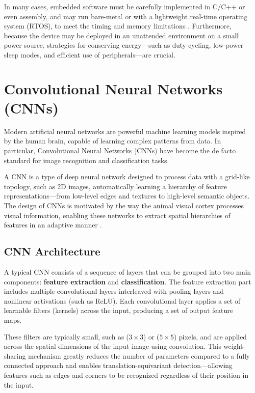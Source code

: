 In many cases, embedded software must be carefully implemented in C/C++ or even assembly, and may run bare-metal or with a lightweight real-time operating system (RTOS), to meet the timing and memory limitations \cite{techtarget_embedded_system}. Furthermore, because the device may be deployed in an unattended environment on a small power source, strategies for conserving energy---such as duty cycling, low-power sleep modes, and efficient use of peripherals---are crucial.


\clearpage

\section{Convolutional Neural Networks (CNNs)}

Modern artificial neural networks are powerful machine learning models inspired by the human brain, capable of learning complex patterns from data. In particular, Convolutional Neural Networks (CNNs) have become the de facto standard for image recognition and classification tasks.

A CNN is a type of deep neural network designed to process data with a grid-like topology, such as 2D images, automatically learning a hierarchy of feature representations---from low-level edges and textures to high-level semantic objects. The design of CNNs is motivated by the way the animal visual cortex processes visual information, enabling these networks to extract spatial hierarchies of features in an adaptive manner \cite{yamashita2018convolutional}.

\subsection{CNN Architecture}

A typical CNN consists of a sequence of layers that can be grouped into two main components: \textbf{feature extraction} and \textbf{classification}. The feature extraction part includes multiple convolutional layers interleaved with pooling layers and nonlinear activations (such as ReLU). Each convolutional layer applies a set of learnable filters (kernels) across the input, producing a set of output feature maps.

These filters are typically small, such as (\(3 \times 3\)) or (\(5 \times 5\)) pixels, and are applied across the spatial dimensions of the input image using convolution. This weight-sharing mechanism greatly reduces the number of parameters compared to a fully connected approach and enables translation-equivariant detection---allowing features such as edges and corners to be recognized regardless of their position in the input.

